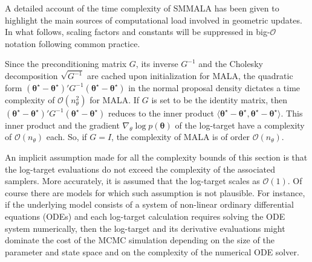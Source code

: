 \documentclass[twoside,11pt]{article}
\begin{document}
A detailed account of the time complexity of SMMALA has been given to highlight the main sources of computational load
involved in geometric updates. In what follows, scaling factors and constants will be suppressed in big-$\mathcal{O}$ 
notation following common practice.

Since the preconditioning matrix $G$, its inverse $G^{-1}$ and the Cholesky decomposition $\sqrt{G^{-1}}$ are cached upon 
initialization for MALA, the quadratic form
$
(\boldsymbol{\theta}^{\star}-\boldsymbol{\theta}^{\star})'
G^{-1}
(\boldsymbol{\theta}^{\star}-\boldsymbol{\theta}^{\star})
$
in the normal proposal density dictates a time complexity of $\mathcal{O}(n_{\theta}^2)$ for MALA. If $G$ is set to be the 
identity matrix, then
$
(\boldsymbol{\theta}^{\star}-\boldsymbol{\theta}^{\star})'
G^{-1}
(\boldsymbol{\theta}^{\star}-\boldsymbol{\theta}^{\star})
$
reduces to the inner product
$
\langle\boldsymbol{\theta}^{\star}-\boldsymbol{\theta}^{\star},
\boldsymbol{\theta}^{\star}-\boldsymbol{\theta}^{\star}\rangle
$. This inner product and the gradient $\nabla_{\theta}\log{p(\boldsymbol{\theta})}$  of the log-target have a complexity of 
$\mathcal{O}(n_{\theta})$ each. So, if $G=I$, the complexity of MALA is of order $\mathcal{O}(n_{\theta})$.

%
An implicit assumption made for all the complexity bounds of this section is that the log-target evaluations do not
exceed the complexity of the associated samplers. More accurately, it is assumed that the log-target scales as
$\mathcal{O}(1)$. Of course there are models for which such assumption is not plausible. For instance, if the underlying 
model consists of a system of non-linear ordinary differential equations (ODEs) and each log-target calculation requires 
solving the ODE system numerically, then the log-target and its derivative evaluations might dominate the cost of the MCMC 
simulation depending on the size of the parameter and state space and on the complexity of the numerical ODE solver.
\end{document}
